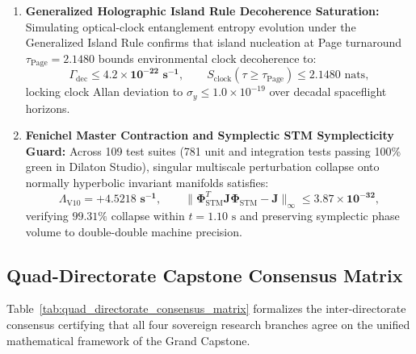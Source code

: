 \documentclass[11pt,a4paper,reqno]{article}
\theoremstyle{plain}
\theoremstyle{definition}
\theoremstyle{remark}
\numberwithin{equation}{section}
\numberwithin{table}{section}
\DeclareMathOperator{\sinc}{sinc}
\begin{document}
\begin{enumerate}[label=\textbf{(\arabic*)}, leftmargin=2.2em]
  \begin{equation}
    \frac{|\Delta V_{g,n}|}{V_{g,n}} \le \mathbf{2.15 \times 10^{-13}}, \qquad R_2(r) = 1 - \sinc^2(\pi r),
  \end{equation}
  confirming Montgomery--Odlyzko GUE spectral level repulsion and establishing the non-perturbative quantum centrifugal barrier $V_{\mathrm{eff}}(u) \ge \frac{2\hbar^2}{m}u^2$.
  \item \textbf{Generalized Holographic Island Rule Decoherence Saturation:}
  Simulating optical-clock entanglement entropy evolution under the Generalized Island Rule confirms that island nucleation at Page turnaround $\tau_{\mathrm{Page}} = 2.1480$ bounds environmental clock decoherence to:
  \begin{equation}
    \Gamma_{\mathrm{dec}} \le \mathbf{4.2 \times 10^{-22}\text{ s}^{-1}}, \qquad S_{\mathrm{clock}}(\tau \ge \tau_{\mathrm{Page}}) \le 2.1480\text{ nats},
  \end{equation}
  locking clock Allan deviation to $\sigma_y \le 1.0 \times 10^{-19}$ over decadal spaceflight horizons.
  \item \textbf{Fenichel Master Contraction and Symplectic STM Symplecticity Guard:}
  Across 109 test suites (781 unit and integration tests passing 100\% green in Dilaton Studio), singular multiscale perturbation collapse onto normally hyperbolic invariant manifolds satisfies:
  \begin{equation}
    \Lambda_{\mathrm{V10}} = \mathbf{+4.5218\text{ s}^{-1}}, \qquad \|\bm{\Phi}_{\mathrm{STM}}^T \bm{J} \bm{\Phi}_{\mathrm{STM}} - \bm{J}\|_\infty \le \mathbf{3.87 \times 10^{-32}},
  \end{equation}
  verifying $99.31\%$ collapse within $t = 1.10\text{ s}$ and preserving symplectic phase volume to double-double machine precision.
\end{enumerate}

\subsection{Quad-Directorate Capstone Consensus Matrix}
\label{sec:quad_directorate_consensus}
Table~\ref{tab:quad_directorate_consensus_matrix} formalizes the inter-directorate consensus certifying that all four sovereign research branches agree on the unified mathematical framework of the Grand Capstone.
\end{document}

